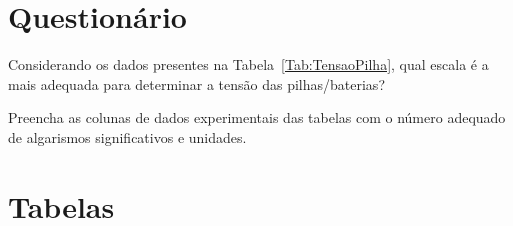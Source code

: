 
\vspace{15mm}

\begin{fullwidth}
\noindent{}
\vspace{5mm}

\noindent{}

\noindent{}

\noindent{}

\noindent{}

\noindent{}
\end{fullwidth}

\vspace{5mm}

\section{Questionário}

\begin{question}[type={exam}]{1}
Considerando os dados presentes na Tabela~\ref{Tab:TensaoPilha}, qual escala é a mais adequada para determinar a tensão das pilhas/baterias?
\end{question}

\begin{question}[type={exam}]{1}
Preencha as colunas de dados experimentais das tabelas com o número adequado de algarismos significativos e unidades.
\end{question}


\vfill
\pagebreak
\section{Tabelas}

